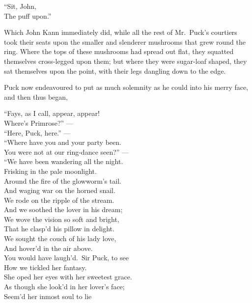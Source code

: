 \documentclass[
  12pt,
  a5paper,
  twoside]{book}
\begin{document}
``Sit, John,\\
The puff upon.''

Which John Kann immediately did, while all the rest of Mr.~Puck's
courtiers took their seats upon the smaller and slenderer mushrooms that
grew round the ring. Where the tops of these mushrooms had spread out
flat, they squatted themselves cross-legged upon them; but where they
were sugar-loaf shaped, they sat themselves upon the point, with their
legs dangling down to the edge.

Puck now endeavoured to put as much solemnity as he could into his merry
face, and then thus began,

``Fays, as I call, appear, appear!\\
Where's Primrose?'' ---\\
``Here, Puck, here.'' ---\\
``Where have you and your party been.\\
You were not at our ring-dance seen?'' ---\\
``We have been wandering all the night.\\
Frisking in the pale moonlight.\\
Around the fire of the glowworm's tail.\\
And waging war on the horned snail.\\
We rode on the ripple of the stream.\\
And we soothed the lover in his dream;\\
We wove the vision so soft and bright,\\
That he clasp'd his pillow in delight.\\
We sought the couch of his lady love,\\
And hover'd in the air above.\\
You would have laugh'd.~Sir Puck, to see\\
How we tickled her fantasy.\\
She oped her eyes with her sweetest grace.\\
As though she look'd in her lover's face;\\
Seem'd her inmost soul to lie
\end{document}
